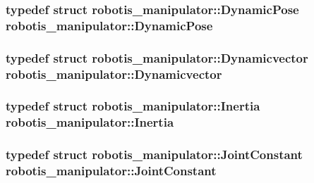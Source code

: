 \subsubsection[{\texorpdfstring{Dynamic\+Pose}{DynamicPose}}]{\setlength{\rightskip}{0pt plus 5cm}typedef struct {\bf robotis\+\_\+manipulator\+::\+Dynamic\+Pose}  {\bf robotis\+\_\+manipulator\+::\+Dynamic\+Pose}}\hypertarget{namespacerobotis__manipulator_a708cc4bcd2a495ef984c7a733666d088}{}\label{namespacerobotis__manipulator_a708cc4bcd2a495ef984c7a733666d088}
\subsubsection[{\texorpdfstring{Dynamicvector}{Dynamicvector}}]{\setlength{\rightskip}{0pt plus 5cm}typedef struct {\bf robotis\+\_\+manipulator\+::\+Dynamicvector}  {\bf robotis\+\_\+manipulator\+::\+Dynamicvector}}\hypertarget{namespacerobotis__manipulator_a5b7433687a9ee2bad6b3340cdf211292}{}\label{namespacerobotis__manipulator_a5b7433687a9ee2bad6b3340cdf211292}
\subsubsection[{\texorpdfstring{Inertia}{Inertia}}]{\setlength{\rightskip}{0pt plus 5cm}typedef struct {\bf robotis\+\_\+manipulator\+::\+Inertia}  {\bf robotis\+\_\+manipulator\+::\+Inertia}}\hypertarget{namespacerobotis__manipulator_a8c647a7589b972af5f7d31362b334be1}{}\label{namespacerobotis__manipulator_a8c647a7589b972af5f7d31362b334be1}
\subsubsection[{\texorpdfstring{Joint\+Constant}{JointConstant}}]{\setlength{\rightskip}{0pt plus 5cm}typedef struct {\bf robotis\+\_\+manipulator\+::\+Joint\+Constant}  {\bf robotis\+\_\+manipulator\+::\+Joint\+Constant}}\hypertarget{namespacerobotis__manipulator_aeefccd90c348d7afefbe86e8380227f9}{}\label{namespacerobotis__manipulator_aeefccd90c348d7afefbe86e8380227f9}
